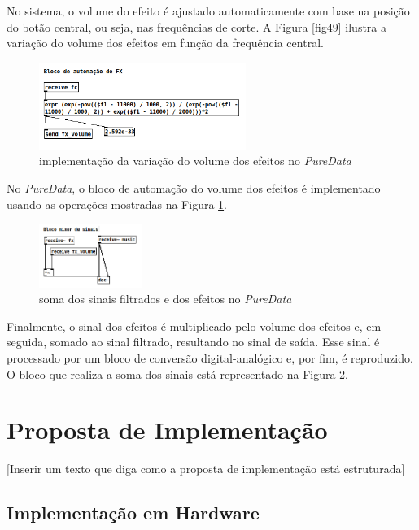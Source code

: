 No sistema, o volume do efeito é ajustado automaticamente com base na posição do botão central, ou seja, nas frequências de corte. A Figura \ref{fig49} ilustra a variação do volume dos efeitos em função da frequência central.

\begin{figure}[h]
    \centering
    \includegraphics[width=0.6\textwidth]{figuras/fig50.png}
    \caption{implementação da variação do volume dos efeitos no \textit{PureData}}
    \label{fig50}
\end{figure}

\newpage
No \textit{PureData}, o bloco de automação do volume dos efeitos é implementado usando as operações mostradas na Figura \ref{fig50}.

\begin{figure}[h]
    \centering
    \includegraphics[width=0.3\textwidth]{figuras/fig51.png}
    \caption{soma dos sinais filtrados e dos efeitos no \textit{PureData}}
    \label{fig51}
\end{figure}

Finalmente, o sinal dos efeitos é multiplicado pelo volume dos efeitos e, em seguida, somado ao sinal filtrado, resultando no sinal de saída. Esse sinal é processado por um bloco de conversão digital-analógico e, por fim, é reproduzido. O bloco que realiza a soma dos sinais está representado na Figura \ref{fig51}.

\section{Proposta de Implementação}

[Inserir um texto que diga como a proposta de implementação está estruturada]

\subsection{Implementação em Hardware}


